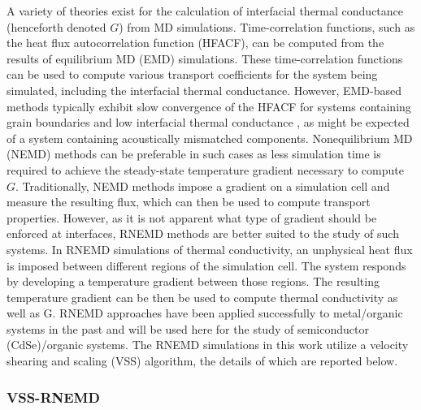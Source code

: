 A variety of theories exist for the calculation of interfacial thermal conductance (henceforth denoted $G$) from MD simulations. Time-correlation functions, such as the heat flux autocorrelation function (HFACF), can be computed from the results of equilibrium MD (EMD) simulations. These time-correlation functions can be used to compute various transport coefficients for the system being simulated, including the interfacial thermal conductance. However, EMD-based methods typically exhibit slow convergence of the HFACF for systems containing grain boundaries and low interfacial thermal conductance \cite{PhysRevB.65.144306}, as might be expected of a system containing acoustically mismatched components. Nonequilibrium MD (NEMD) methods can be preferable in such cases as less simulation time is required to achieve the steady-state temperature gradient necessary to compute $G$. Traditionally, NEMD methods impose a gradient on a simulation cell and measure the resulting flux, which can then be used to compute transport properties. However, as it is not apparent what type of gradient should be enforced at interfaces, RNEMD methods are better suited to the study of such systems. In RNEMD simulations of thermal conductivity, an unphysical heat flux is imposed between different regions of the simulation cell. The system responds by developing a temperature gradient between those regions. The resulting temperature gradient can be then be used to compute thermal conductivity as well as G. RNEMD approaches have been applied successfully to metal/organic systems in the past \cite{doi:10.1021/jp2073478,luo2010equilibrium,Luo20101,doi:10.1021/ct500221u} and will be used here for the study of semiconductor (CdSe)/organic systems. The RNEMD simulations in this work utilize a velocity shearing and scaling (VSS) algorithm, the details of which are reported below. \par

\subsubsection{VSS-RNEMD}

